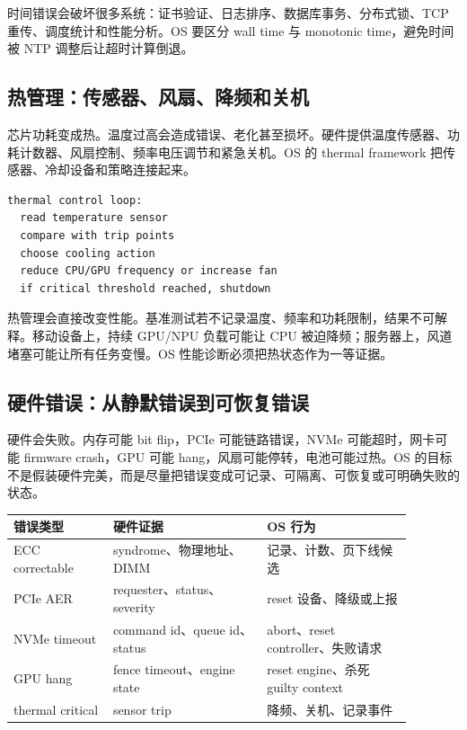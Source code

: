 时间错误会破坏很多系统：证书验证、日志排序、数据库事务、分布式锁、TCP 重传、调度统计和性能分析。OS 要区分 wall time 与 monotonic time，避免时间被 NTP 调整后让超时计算倒退。

\subsection{热管理：传感器、风扇、降频和关机}

芯片功耗变成热。温度过高会造成错误、老化甚至损坏。硬件提供温度传感器、功耗计数器、风扇控制、频率电压调节和紧急关机。OS 的 thermal framework 把传感器、冷却设备和策略连接起来。

\begin{lstlisting}
thermal control loop:
  read temperature sensor
  compare with trip points
  choose cooling action
  reduce CPU/GPU frequency or increase fan
  if critical threshold reached, shutdown
\end{lstlisting}

热管理会直接改变性能。基准测试若不记录温度、频率和功耗限制，结果不可解释。移动设备上，持续 GPU/NPU 负载可能让 CPU 被迫降频；服务器上，风道堵塞可能让所有任务变慢。OS 性能诊断必须把热状态作为一等证据。

\subsection{硬件错误：从静默错误到可恢复错误}

硬件会失败。内存可能 bit flip，PCIe 可能链路错误，NVMe 可能超时，网卡可能 firmware crash，GPU 可能 hang，风扇可能停转，电池可能过热。OS 的目标不是假装硬件完美，而是尽量把错误变成可记录、可隔离、可恢复或可明确失败的状态。

\begin{longtable}{p{0.22\linewidth}p{0.34\linewidth}p{0.32\linewidth}}
\toprule
错误类型 & 硬件证据 & OS 行为 \\
\midrule
ECC correctable & syndrome、物理地址、DIMM & 记录、计数、页下线候选 \\
PCIe AER & requester、status、severity & reset 设备、降级或上报 \\
NVMe timeout & command id、queue id、status & abort、reset controller、失败请求 \\
GPU hang & fence timeout、engine state & reset engine、杀死 guilty context \\
thermal critical & sensor trip & 降频、关机、记录事件 \\
\bottomrule
\end{longtable}

